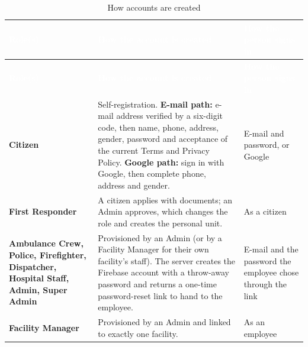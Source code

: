 {\tabfont\rowband
\begin{longtable}{@{}>{\raggedright\arraybackslash}p{}>{\raggedright\arraybackslash}p{}>{\raggedright\arraybackslash}p{}@{}}
\caption{How accounts are created}\label{tab:accounts}\\
\rowcolor{najdanavy}\textcolor{white}{\sffamily\bfseries\small Role(s)} & \textcolor{white}{\sffamily\bfseries\small How the account is created} & \textcolor{white}{\sffamily\bfseries\small How the person signs in}\\
\endfirsthead
\rowcolor{najdanavy}\textcolor{white}{\sffamily\bfseries\small Role(s)} & \textcolor{white}{\sffamily\bfseries\small How the account is created} & \textcolor{white}{\sffamily\bfseries\small How the person signs in}\\
\endhead
\bottomrule\endlastfoot
\textbf{Citizen} & Self-registration. \textbf{E-mail path:} e-mail address verified by a six-digit code, then name, phone, address, gender, password and acceptance of the current Terms and Privacy Policy. \textbf{Google path:} sign in with Google, then complete phone, address and gender. & E-mail and password, or Google\\
\textbf{First Responder} & A citizen applies with documents; an Admin approves, which changes the role and creates the personal unit. & As a citizen\\
\textbf{Ambulance Crew, Police, Firefighter, Dispatcher, Hospital Staff, Admin, Super Admin} & Provisioned by an Admin (or by a Facility Manager for their own facility’s staff). The server creates the Firebase account with a throw-away password and returns a one-time password-reset link to hand to the employee. & E-mail and the password the employee chose through the link\\
\textbf{Facility Manager} & Provisioned by an Admin and linked to exactly one facility. & As an employee\\
\end{longtable}}
